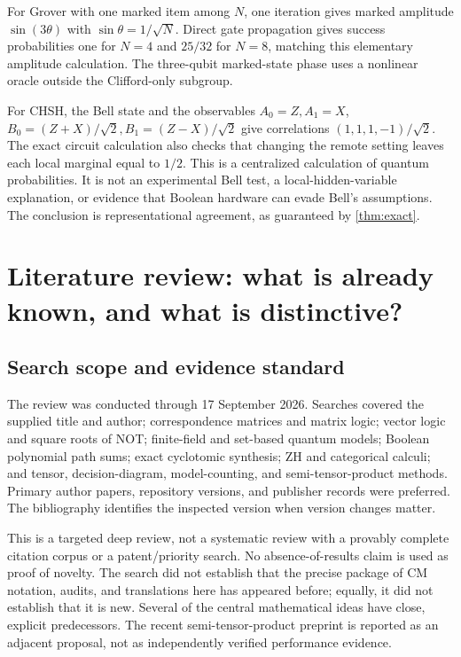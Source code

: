 For Grover with one marked item among $N$, one iteration gives marked amplitude $\sin(3\theta)$ with $\sin\theta=1/\sqrt N$. Direct gate propagation gives success probabilities one for $N=4$ and $25/32$ for $N=8$, matching this elementary amplitude calculation. The three-qubit marked-state phase uses a nonlinear oracle outside the Clifford-only subgroup.

For CHSH, the Bell state and the observables $A_0=Z,A_1=X$, $B_0=(Z+X)/\sqrt2,B_1=(Z-X)/\sqrt2$ give correlations $(1,1,1,-1)/\sqrt2$. The exact circuit calculation also checks that changing the remote setting leaves each local marginal equal to $1/2$. This is a centralized calculation of quantum probabilities. It is not an experimental Bell test, a local-hidden-variable explanation, or evidence that Boolean hardware can evade Bell's assumptions. The conclusion is representational agreement, as guaranteed by \cref{thm:exact}.

\section{Literature review: what is already known, and what is distinctive?}\label{sec:literature}
\subsection{Search scope and evidence standard}
The review was conducted through 17 September 2026. Searches covered the supplied title and author; correspondence matrices and matrix logic; vector logic and square roots of NOT; finite-field and set-based quantum models; Boolean polynomial path sums; exact cyclotomic synthesis; ZH and categorical calculi; and tensor, decision-diagram, model-counting, and semi-tensor-product methods. Primary author papers, repository versions, and publisher records were preferred. The bibliography identifies the inspected version when version changes matter.

This is a targeted deep review, not a systematic review with a provably complete citation corpus or a patent/priority search. No absence-of-results claim is used as proof of novelty. The search did not establish that the precise package of CM notation, audits, and translations here has appeared before; equally, it did not establish that it is new. Several of the central mathematical ideas have close, explicit predecessors. The recent semi-tensor-product preprint is reported as an adjacent proposal, not as independently verified performance evidence.

